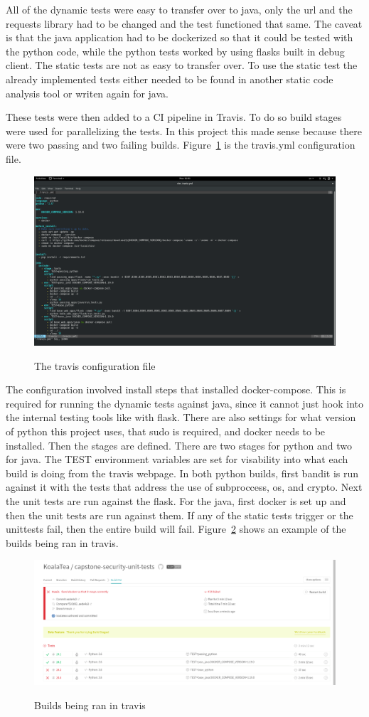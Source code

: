 All of the dynamic tests were easy to transfer over to java, only the url and the requests library had to be changed and the test functioned that same. The caveat is that the java application had to
be dockerized so that it could be tested with the python code, while the python tests worked by using flasks built in debug client. The static tests are not as easy to transfer over. To use the
static test the already implemented tests either needed to be found in another static code analysis tool or writen again for java.

These tests were then added to a CI pipeline in Travis. To do so build stages were used for parallelizing the tests. In this project this made sense because there were two passing and two failing
builds. Figure~\ref{fig:fig4} is the travis.yml configuration file.
\begin{figure}[!ht]
  \centering
\includegraphics[width=6in]{travis}
\caption{\label{fig:fig4}}The travis configuration file
\end{figure}
The configuration involved install steps that installed docker-compose. This is required for running the dynamic tests against java, since it cannot just hook into the internal testing tools like
with flask. There are also settings for what version of python this project uses, that sudo is required, and docker needs to be installed. Then the stages are defined. There are two stages for python
and two for java. The TEST environment variables are set for visability into what each build is doing from the travis webpage. In both python builds, first bandit is run against it with the tests
that address the use of subproccess, os, and crypto. Next the unit tests are run against the flask. For the java, first docker is set up and then the unit tests are run against them. If any of the
static tests trigger or the unittests fail, then the entire build will fail. Figure~\ref{fig:fig5} shows an example of the builds being ran in travis.
\begin{figure}[!ht]
  \centering
\includegraphics[width=6in]{travisbuilds}
\caption{\label{fig:fig5}}Builds being ran in travis
\end{figure}

